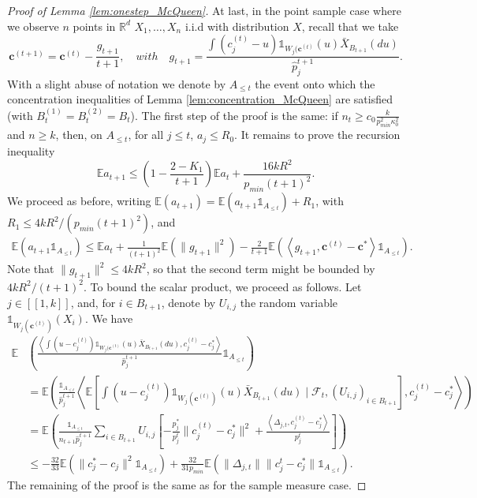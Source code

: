 \documentclass[noinfoline,preprint]{article}
\newcommand{\cb}{\mathbf{c}}
\newcommand{\E}{\mathbb{E}}
\renewcommand{\1}{\mathds 1}
\begin{document}
\begin{proof}[Proof of Lemma \ref{lem:onestep_McQueen}]
At last, in the point sample case where we observe $n$ points in $\mathbb{R}^d$ $X_1, \hdots, X_n$ i.i.d with distribution $X$, recall that we take
\[
\cb^{(t+1)} = \cb^{(t)} - \frac{g_{t+1}}{t+1}, \quad 
\mbox{}with \quad  
g_{t+1} = \frac{ \int (c_j^{(t)}-u)\mathds{1}_{W_j(\cb^{(t)}}(u)\bar{X}_{B_{t+1}}(du)}{\hat{p}_j^{t+1}}.
\] 
With a slight abuse of notation we denote by $A_{\leq t}$ the event onto which the concentration inequalities of Lemma \ref{lem:concentration_McQueen} are satisfied (with $B_{t}^{(1)} = B_{t}^{(2)} = B_{t}$). The first step of the proof is the same: if $n_{t} \geq c_0 \frac{k}{p_{min}^2 \kappa_0^2}$ and $ n \geq k$, then, on $A_{\leq t}$, for all $j \leq t$, $a_j \leq R_0$. It remains to prove the recursion inequality
\[
\mathbb{E}a_{t+1} \leq \left ( 1 - \frac{2-K_1}{t+1} \right ) \mathbb{E}a_t + \frac{16kR^2}{p_{min}(t+1)^2}.
\]
We proceed as before, writing $\E(a_{t+1}) = \E(a_{t+1}\mathds{1}_{A_{\leq t}}) + R_1$, with $R_1 \leq 4kR^2/(p_{min}(t+1)^2)$, and
\begin{align*}
\E(a_{t+1}\mathds{1}_{A_{\leq t}}) \leq \E a_t + \frac{1}{(t+1)^2} \E (\|g_{t+1}\|^2)- \frac{2}{t+1} \E \left ( \left\langle g_{t+1}, \cb^{(t)} - \cb^* \right\rangle \1_{A_{\leq t}} \right ). 
\end{align*} 
Note that $\|g_{t+1}\|^2 \leq 4 k R^2$, so that the second term might be bounded by $4kR^2/(t+1)^2$. To bound the scalar product, we proceed as follows. Let $j \in [\![1,k]\!]$, and, for $i \in B_{t+1}$, denote by $U_{i,j}$ the random variable $\1_{W_j(\cb^{(t)})}(X_i)$. We have
\begin{align*}
\E & \left ( \frac{\left\langle  \int (u - c_j^{(t)}) \1_{W_j(\cb^{(t)}}(u)\bar{X}_{B_{t+1}}(du), c_j^{(t)}- c_j^* \right\rangle} {\hat{p}_j^{t+1}} \1_{A_{\leq t}} \right ) \\
&  = \E \left ( \frac{\1_{A _{\leq t}}}{\hat{p}_{j}^{t+1}} \left\langle \mathbb{E} \left [  \int (u - c_j^{(t)}) \1_{W_j(\cb^{(t)})}(u)\bar{X}_{B_{t+1}}(du) \mid \mathcal{F}_t,(U_{i,j})_{i \in B_{t+1}} \right ] , c_j^{(t)}- c_j^* \right\rangle \right ) \\
 & = \E \left ( \frac{\1_{A _{\leq t}}}{n_{t+1} \hat{p}_{j}^{t+1}} \sum_{i \in B_{t+1}} U_{i,j} \left[ - \frac{p_j^*}{p_j^t} \| c_j^{(t)} - c_j^*\|^2 + \frac{\left\langle \Delta_{j,t}, c_j^{(t)} - c_j^* \right\rangle}{p_j^t} \right ]  \right ) \\
& \leq -\frac{32}{33}\E ( \|c_j^* - c_j\|^2 \1_{A_{\leq t}} ) + \frac{32}{31 p_{min}} \E ( \| \Delta_{j,t}\| \|c_j^t - c_j^* \| \1_{A_{\leq t}} ). 
\end{align*}
The remaining of the proof is the same as for the sample measure case.
\end{proof}
\end{document}
